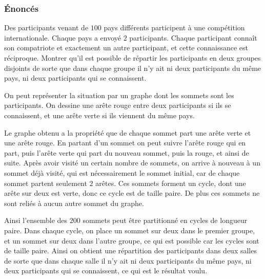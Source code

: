 \subsubsection{Énoncés}

\begin{exo}
Des participants venant de $100$ pays différents participent à une compétition internationale. Chaque pays a envoyé $2$ participants. Chaque participant connaît son compatriote et exactement un autre participant, et cette connaissance est réciproque. Montrer qu'il est possible de répartir les participants en deux groupes disjoints de sorte que dans chaque groupe il n'y ait ni deux participants du même pays, ni deux participants qui se connaissent.
\end{exo}

\begin{sol}

On peut représenter la situation par un graphe dont les sommets sont les participants. On dessine une arête rouge entre deux participants si ils se connaissent, et une arête verte si ils viennent du même pays.

\medskip

Le graphe obtenu a la propriété que de chaque sommet part une arête verte et une arête rouge. En partant d'un sommet on peut suivre l'arête rouge qui en part, puis l'arête verte qui part du nouveau sommet, puis la rouge, et ainsi de suite. Après avoir visité un certain nombre de sommets, on arrive à nouveau à un sommet déjà visité, qui est nécessairement le sommet initial, car de chaque sommet partent seulement $2$ arêtes. Ces sommets forment un cycle, dont une arête sur deux est verte, donc ce cycle est de taille paire. De plus ces sommets ne sont reliés à aucun autre sommet du graphe.

\medskip

Ainsi l'ensemble des $200$ sommets peut être partitionné en cycles de longueur paire. Dans chaque cycle, on place un sommet sur deux dans le premier groupe, et un sommet sur deux dans l'autre groupe, ce qui est possible car les cycles sont de taille paire. Ainsi on obtient une répartition des participants dans deux salles de sorte que dans chaque salle il n'y ait ni deux participants du même pays, ni deux participants qui se connaissent, ce qui est le résultat voulu.
\end{sol}



